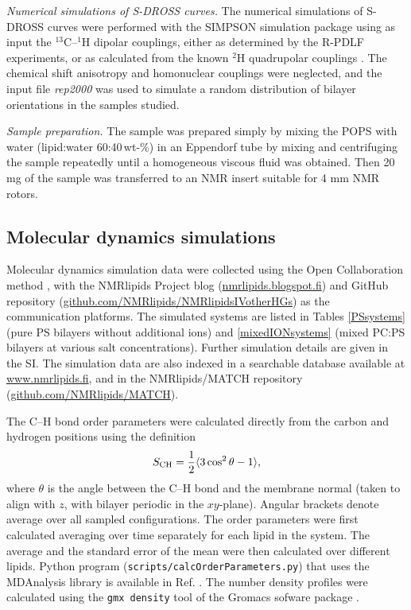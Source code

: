\documentclass[aps,prl,superscriptaddress,twocolumn]{revtex4}
\begin{document}
\emph{Numerical simulations of S-DROSS curves.}
The numerical simulations of S-DROSS curves were performed with the SIMPSON simulation package \cite{bak00}
using as input the $^{13}$C--$^1$H
dipolar couplings, either as determined by the R-PDLF experiments, or as calculated from the known $^2$H quadrupolar couplings \cite{browning80}.
The chemical shift anisotropy and homonuclear couplings were neglected, and the input file {\it{rep2000}} was used to simulate a random
distribution of bilayer orientations in the samples studied.

\emph{Sample preparation.}
The sample was prepared simply by mixing the POPS  with water (lipid:water 60:40\,wt-\%) in an Eppendorf
tube by mixing and centrifuging the sample repeatedly until a  homogeneous viscous fluid was obtained.
Then 20 mg of the sample was  transferred to an NMR insert suitable for 4 mm NMR rotors.  


\subsection{Molecular dynamics simulations}
Molecular dynamics simulation data were collected using
the Open Collaboration method \cite{botan15}, with
the NMR\-lipids Project blog (\url{nmrlipids.blogspot.fi}) and
GitHub repository (\url{github.com/NMRlipids/NMRlipidsIVotherHGs})
as the communication platforms.
The simulated systems are listed in 
Tables \ref{PSsystems} (pure PS bilayers without additional ions) 
and \ref{mixedIONsystems} (mixed PC:PS bilayers at various salt concentrations).
Further simulation details are given in the SI.
The simulation data are also indexed in a
searchable database available at \url{www.nmrlipids.fi},
and in the NMRlipids/MATCH repository (\url{github.com/NMRlipids/MATCH}).

The C--H bond order parameters were calculated directly
from the carbon and hydrogen positions using the definition
\begin{equation}
S_{\rm CH}=\frac{1}{2}\langle 3\cos^2\theta -1 \rangle,
\end{equation}
where $\theta$ is the angle between the C--H bond and the membrane normal
(taken to align with $z$, with bilayer periodic in the $xy$-plane).
Angular brackets denote average over all sampled configurations.
The order parameters were first calculated averaging over time separately
for each lipid in the system. The average and
the standard error of the mean were then calculated over different lipids.
Python program ({\tt scripts/calcOrderParameters.py}) that uses the
MDAnalysis library \cite{agrawal11,gowers16} is available in Ref. . 
The number density profiles were calculated using the {\tt gmx density} tool
of the Gromacs sofware package \cite{gromacsMANUAL}.
\end{document}
